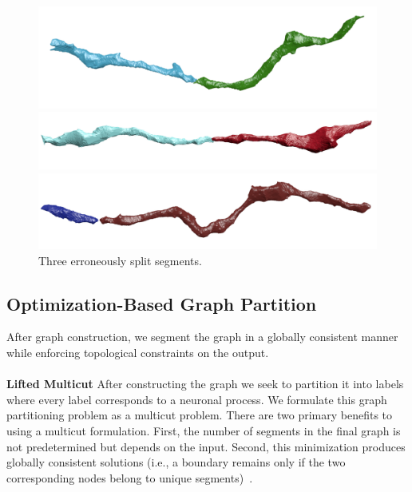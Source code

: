 \begin{figure}[t]
	\centering
	\begin{minipage}{0.32\linewidth}
		\includegraphics[width=\linewidth]{./figures/split_error1.png}		
	\end{minipage}
	\hfill
	\begin{minipage}{0.32\linewidth}
		\includegraphics[width=\linewidth]{./figures/split_error2.png}				
	\end{minipage}
	\hfill
	\begin{minipage}{0.32\linewidth}
		\includegraphics[width=\linewidth]{./figures/split_error3.png}
	\end{minipage}
	\caption{Three erroneously split segments.}
	\label{fig:merge_candidates}
\end{figure}
\subsection{Optimization-Based Graph Partition}
\label{sec:optimization}
After graph construction, we segment the graph in a globally consistent manner while enforcing topological constraints on the output.
\\~\\
\noindent\textbf{Lifted Multicut}
After constructing the graph we seek to partition it into labels where every label corresponds to a neuronal process. 
We formulate this graph partitioning problem as a multicut problem.
There are two primary benefits to using a multicut formulation. 
First, the number of segments in the final graph is not predetermined but depends on the input. 
Second, this minimization produces globally consistent solutions (i.e., a boundary remains only if the two corresponding nodes belong to unique segments)~\cite{keuper2015efficient}.

